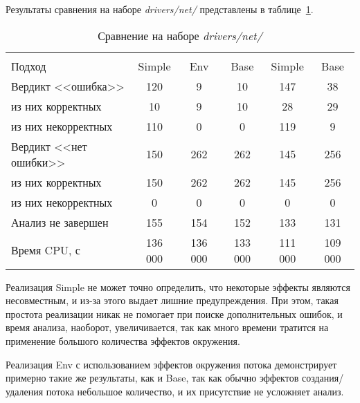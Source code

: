 Результаты сравнения на наборе \textit{drivers/net/} представлены в таблице~\ref{table-drivers-thread}.

  \begin{table}[h]\footnotesize \centering
  	\label{table-drivers-thread}
    \caption{Сравнение  на наборе \textit{drivers/net/}}
    \begin{tabular}{ | l | c | c | c | c | c |}
      \hline
      					& \multicolumn{3}{c|}{\theoryraces} 			& \multicolumn{2}{c|}{\combatmode} 	\\
      Подход         				& Simple 	& Env 		& Base 		& Simple 	& Base  	\\ \hline
      Вердикт <<ошибка>> 			& 120    	& 9   		& 10   		& 147       & 38  	 	\\ 
  \hspace{0.5cm} из них корректных 	& 10 		& 9 		& 10   		& 28       	& 29   		\\ 
  \hspace{0.5cm} из них некорректных & 110 		& 0 		& 0   		& 119       & 9     	\\ \hline
      Вердикт <<нет ошибки>>  		& 150      	& 262    	& 262    	& 145      	& 256     	\\ 
  \hspace{0.5cm} из них корректных 	& 150 		& 262    	& 262    	& 145       & 256   	\\
  \hspace{0.5cm} из них некорректных & 0 		& 0    		& 0     	& 0         & 0   		\\ \hline
      Анализ не завершен       		& 155     	& 154    	& 152    	& 133      	& 131   	\\ \hline
      Время CPU, с   				& 136 000 	& 136 000 	& 133 000 	& 111 000  	& 109 000   \\ 
      \hline
    \end{tabular}
  \end{table}

Реализация Simple не может точно определить, что некоторые эффекты являются несовместным, и из-за этого выдает лишние предупреждения.
При этом, такая простота реализации никак не помогает при поиске дополнительных ошибок, и время анализа, наоборот, увеличивается, так как много времени тратится на применение большого количества эффектов окружения.

Реализация Env с использованием эффектов окружения потока демонстрирует примерно такие же результаты, как и Base, так как обычно эффектов создания/удаления потока небольшое количество, и их присутствие не усложняет анализ.


